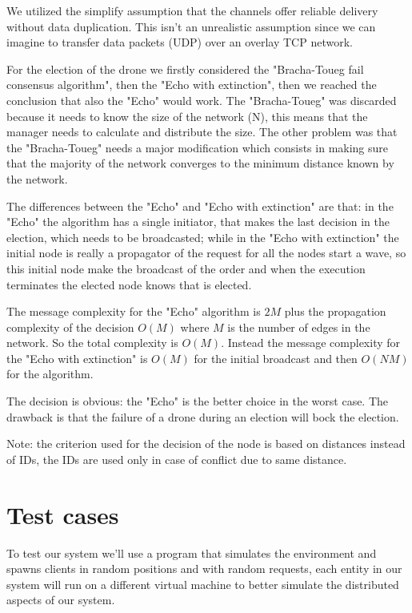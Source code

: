 \documentclass[a4paper, oneside]{memoir}
\begin{document}
We utilized the simplify assumption that the channels offer reliable delivery without data duplication. This isn't an unrealistic assumption since we can imagine to transfer data packets (UDP) over an overlay TCP network.

For the election of the drone we firstly considered the "Bracha-Toueg fail consensus algorithm", then the "Echo with extinction", then we reached the conclusion that also the "Echo" would work. The "Bracha-Toueg" was discarded because it needs to know the size of the network (N), this means that the manager needs to calculate and distribute the size. The other problem was that the "Bracha-Toueg" needs a major modification which consists in making sure that the majority of the network converges to the minimum distance known by the network.

The differences between the "Echo" and "Echo with extinction" are that: in the "Echo" the algorithm has a single initiator, that makes the last decision in the election, which needs to be broadcasted; while in the "Echo with extinction" the initial node is really a propagator of the request for all the nodes start a wave, so this initial node make the broadcast of the order and when the execution terminates the elected node knows that is elected.

The message complexity for the "Echo" algorithm is $2M$ plus the propagation complexity of the decision $O(M)$ where $M$ is the number of edges in the network. So the total complexity is $ O(M) $.
Instead the message complexity for the "Echo with extinction" is $O(M)$ for the initial broadcast and then $O(N M)$ for the algorithm.

The decision is obvious: the "Echo" is the better choice in the worst case. The drawback is that the failure of a drone during an election will bock the election.

Note: the criterion used for the decision of the node is based on distances instead of IDs, the IDs are used only in case of conflict due to same distance.


\section{Test cases}

To test our system we'll use a program that simulates the environment and spawns clients in random positions and with random requests, each entity in our system will run on a different virtual machine to better simulate the distributed aspects of our system.
\end{document}
